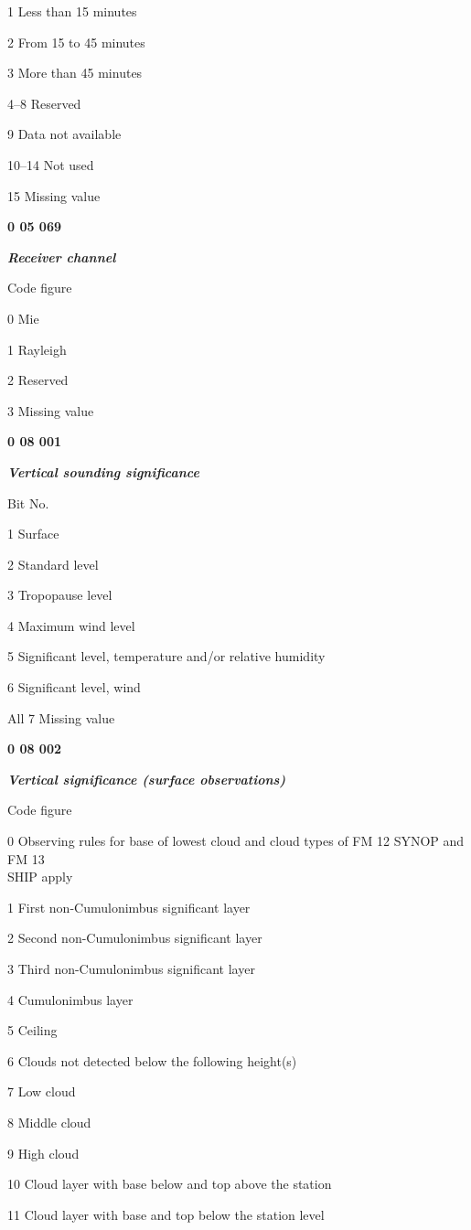 1 Less than 15 minutes

2 From 15 to 45 minutes

3 More than 45 minutes

4--8 Reserved

9 Data not available

10--14 Not used

15 Missing value

\textbf{0 05 069}

\emph{\textbf{Receiver channel}}

Code figure

0 Mie

1 Rayleigh

2 Reserved

3 Missing value

\textbf{0 08 001}

\emph{\textbf{Vertical sounding significance}}

Bit No.

1 Surface

2 Standard level

3 Tropopause level

4 Maximum wind level

5 Significant level, temperature and/or relative humidity

6 Significant level, wind

All 7 Missing value

\textbf{0 08 002}

\emph{\textbf{Vertical significance (surface observations)}}

Code figure

0 Observing rules for base of lowest cloud and cloud types of FM 12 SYNOP and FM 13\\
SHIP apply

1 First non-Cumulonimbus significant layer

2 Second non-Cumulonimbus significant layer

3 Third non-Cumulonimbus significant layer

4 Cumulonimbus layer

5 Ceiling

6 Clouds not detected below the following height(s)

7 Low cloud

8 Middle cloud

9 High cloud

10 Cloud layer with base below and top above the station

11 Cloud layer with base and top below the station level


